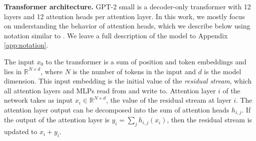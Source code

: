 

\textbf{Transformer architecture.} 
GPT-2 small is a decoder-only transformer with 12 layers and 12 attention heads per attention layer. In this work, we mostly focus on understanding the behavior of attention heads, which we describe below using notation similar to \citet{elhage2021mathematical}. We leave a full description of the model to Appendix \ref{app:notation}. 

The input $x_0$ to the transformer is a sum of position and token embeddings and lies in $\mathbb{R}^{N \times d}$, where $N$ is the number of tokens in the input and $d$ is the model dimension. This input embedding is the initial value of the \textit{residual stream}, which all attention layers and MLPs read from and write to. Attention layer $i$ of the network takes as input $x_{i} \in \mathbb{R}^{N \times d}$, the value of the residual stream at layer $i$. The attention layer output can be decomposed into the sum of {attention heads} $h_{i, j}$. If the output of the attention layer is $y_i = \sum_j h_{i, j}(x_i)$, then the residual stream is updated to $ x_i + y_i$.

